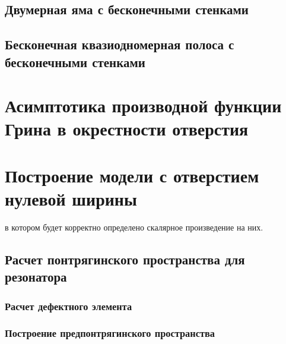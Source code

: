 \subsection{Двумерная яма с бесконечными стенками}

\subsection{Бесконечная квазиодномерная полоса с бесконечными стенками}


\section{Асимптотика производной функции Грина в окрестности отверстия}


\section{Построение модели с отверстием нулевой ширины}
 в котором будет корректно определено скалярное произведение на них.

\subsection{Расчет понтрягинского пространства для резонатора}
\subsubsection{Расчет дефектного элемента}

\subsubsection{Построение предпонтрягинского пространства}
